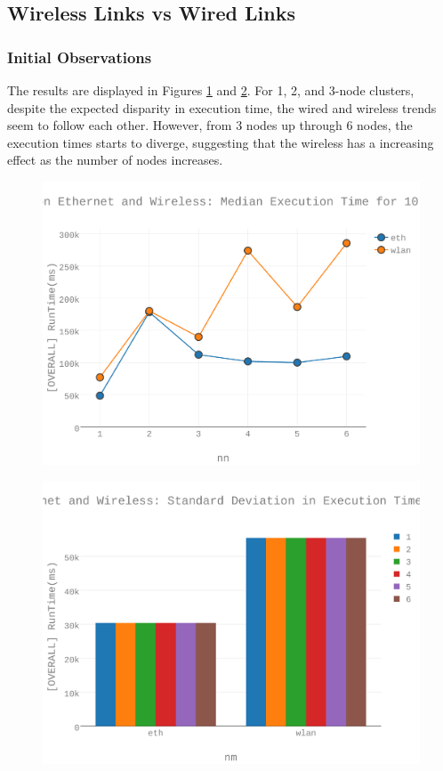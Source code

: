 \subsection{Wireless Links vs Wired Links}
\subsubsection{Initial Observations}
The results are displayed in Figures \ref{figures-wlc_fig7} and \ref{figures-wlc_fig9}.  For 1, 2, and 3-node clusters, despite the expected  disparity in execution time, the wired and wireless trends seem to follow each other.  However, from 3 nodes up through 6 nodes, the execution times starts to diverge, suggesting that the wireless has a increasing effect as the number of nodes increases. \begin{figure}[h]
\includegraphics[width=5.5in]{Figures/figures-wlc_fig7.pdf}
\caption{}
\label{figures-wlc_fig7}
\end{figure}

\begin{figure}[h]
\includegraphics[width=5.5in]{Figures/figures-wlc_fig9.pdf}
\caption{}
\label{figures-wlc_fig9}
\end{figure}



